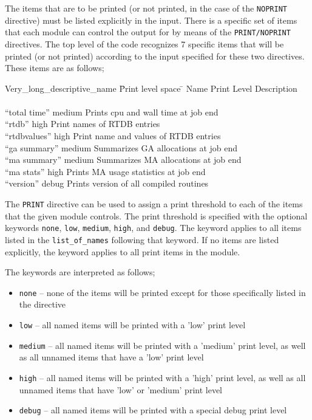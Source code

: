 The items that are to be printed (or not printed, in the case of the
\verb+NOPRINT+ directive) must be listed explicitly in the input.  There
is a specific set of items that each module can control the output for
by means of the \verb+PRINT/NOPRINT+ directives.
The top level of the code recognizes 7 specific items that will be printed
(or not printed) according to the input specified for these two directives.
These items are as follows;
\begin{tabbing}
  Very\_long\_descriptive\_name \= Print level space \= \kill
  Name                   \> Print Level \> Description \\
                         \>        \> \\
 ``total time''        \> medium \> Prints cpu and wall time at job end\\
 ``rtdb''              \> high    \> Print names of RTDB entries\\
 ``rtdbvalues''        \> high    \> Print name and values of RTDB entries\\
 ``ga summary''        \> medium \> Summarizes GA allocations at job end \\
 ``ma summary''        \> medium \> Summarizes MA allocations at job end \\
 ``ma stats''          \> high   \> Prints MA usage statistics at job end \\
 ``version''           \> debug  \> Prints version of all compiled routines \\
\end{tabbing}

The \verb+PRINT+ directive can be used to assign a print threshold to
each of the items that the given module controls.  The print threshold is
specified with the optional keywords \verb+none+, \verb+low+, \verb+medium+,
\verb+high+, and \verb+debug+.  The keyword applies to all items listed
in the \verb+list_of_names+ following that keyword.  If no items are listed
explicitly, the keyword applies to all print items in the module.

The keywords are interpreted as follows;

\begin{itemize}
\item \verb+none+ -- none of the items will be printed except for those
specifically listed in the directive
\item \verb+low+ -- all named items will be printed with a 'low' print level
\item \verb+medium+ -- all named items will be printed with a 'medium' print
level, as well as all unnamed items that have a 'low' print level
\item \verb+high+ -- all named items will be printed with a 'high' print
level, as well as all unnamed items that have 'low' or 'medium' print level
\item \verb+debug+ -- all named items will be printed with a special debug print level
\end{itemize}

